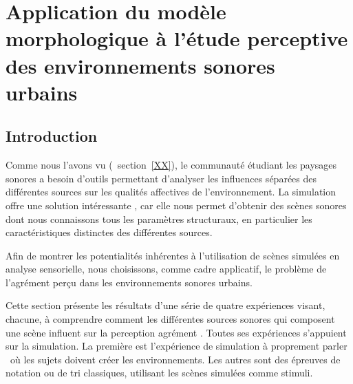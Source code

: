 \chapter[Application à l’étude perceptive des environnements sonores urbains]{Application du modèle morphologique à l’étude perceptive des environnements sonores urbains}\label{ch:psycho_xp}

\section{Introduction}

Comme nous l'avons vu (\Cf~section~\ref{XX}), le communauté étudiant  les paysages sonores a besoin d'outils permettant d'analyser les influences séparées des différentes sources  sur les qualités affectives de l'environnement. La simulation offre une solution intéressante , car elle nous permet d'obtenir des scènes sonores dont nous connaissons tous les paramètres structuraux, en particulier les caractéristiques distinctes des différentes sources. 
 
Afin de montrer les potentialités inhérentes à l'utilisation de scènes simulées en analyse sensorielle, nous choisissons, comme cadre applicatif, le problème de l'agrément perçu dans les environnements sonores urbains. 

Cette section présente les résultats d'une série de quatre expériences visant, chacune, à comprendre comment les différentes sources sonores qui composent une scène influent sur la perception agrément . Toutes ses expériences s'appuient sur la simulation. La première est l'expérience de simulation à proprement parler \ie~où les sujets doivent créer les environnements. Les autres sont des épreuves de notation ou de tri classiques, utilisant les scènes simulées comme stimuli. 


